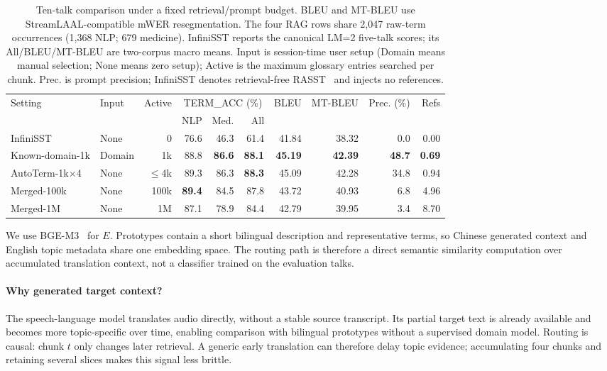 \begin{table}[t]
\centering
\footnotesize
\setlength{\tabcolsep}{3.5pt}
\begin{tabular}{llrrrrrrrr}
\toprule
Setting & Input & Active & \multicolumn{3}{c}{TERM\_ACC (\%)} & BLEU & MT-BLEU & Prec. (\%) & Refs \\
\cmidrule(lr){4-6}
& & & NLP & Med. & All & & & & \\
\midrule
InfiniSST & None & 0 & 76.6 & 46.3 & 61.4 & 41.84 & 38.32 & 0.0 & 0.00 \\
Known-domain-1k & Domain & 1k & 88.8 & \textbf{86.6} & \textbf{88.1} & \textbf{45.19} & \textbf{42.39} & \textbf{48.7} & \textbf{0.69} \\
AutoTerm-1k$\times$4 & None & $\leq$4k & 89.3 & 86.3 & \textbf{88.3} & 45.09 & 42.28 & 34.8 & 0.94 \\
Merged-100k & None & 100k & \textbf{89.4} & 84.5 & 87.8 & 43.72 & 40.93 & 6.8 & 4.96 \\
Merged-1M & None & 1M & 87.1 & 78.9 & 84.4 & 42.79 & 39.95 & 3.4 & 8.70 \\
\bottomrule
\end{tabular}
\caption{Ten-talk comparison under a fixed retrieval/prompt budget. BLEU and
MT-BLEU use StreamLAAL-compatible mWER resegmentation. The four RAG rows share
2,047 raw-term occurrences (1,368 NLP; 679 medicine). InfiniSST reports the
canonical LM=2 five-talk scores; its All/BLEU/MT-BLEU are two-corpus macro
means. Input is session-time user setup (Domain means manual selection; None
means zero setup); Active is the maximum glossary entries searched per chunk.
Prec. is prompt precision; InfiniSST denotes
retrieval-free RASST~\citep{ouyang2025infinisst} and injects no references.}
\label{tab:quality}
\end{table}

We use BGE-M3~\citep{chen-etal-2024-m3} for $E$. Prototypes contain a short bilingual description and
representative terms, so Chinese generated context and English topic metadata
share one embedding space. The routing path is therefore a direct semantic
similarity computation over accumulated translation context, not a classifier
trained on the evaluation talks.

\paragraph{Why generated target context?}
The speech-language model translates audio directly, without a stable source
transcript. Its partial target text is already available and becomes more
topic-specific over time, enabling comparison with bilingual prototypes
without a supervised domain model. Routing is causal: chunk $t$ only changes
later retrieval. A generic early translation can therefore delay topic
evidence; accumulating four chunks and retaining several slices makes this
signal less brittle.

